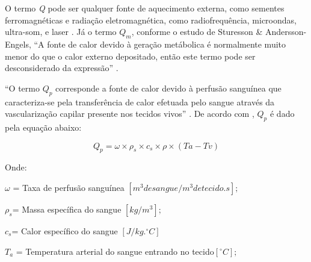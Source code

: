  O termo {\itshape Q} pode ser qualquer fonte de aquecimento externa, como sementes ferromagnéticas e radiação eletromagnética, como radiofrequência, microondas, ultra-som, e laser \cite[p.10]{Giselle}. Já o termo {\itshape $Q_{m}$}, conforme o estudo de  Sturesson \& Andersson-Engels, ``A  fonte de calor devido à geração metábolica é normalmente muito menor do que o calor externo depositado, então este termo pode ser desconsiderado da expressão'' . %

       ``O termo {\itshape $Q_{p}$} corresponde a fonte de calor devido à perfusão sanguínea que caracteriza-se pela transferência de calor efetuada pelo sangue através da vascularização capilar presente nos tecidos vivos'' \cite{Carla}.%
       De acordo com \cite{Giselle},  {\itshape $Q_{p}$} é dado pela equação abaixo:


    \begin{equation} Q_{p}= \omega\times\rho_{s}\times c_{s}\times\rho\times(Ta-Tv)\end{equation} 

       Onde:

       $\omega$ = Taxa de perfusão sanguínea $[m^3 de sangue/m^3 de tecido.s];$

      $ \rho_{s} $= Massa específica do sangue $[kg/m^3];$

        $c_{s} $= Calor específico do sangue  $[J/kg.^{\circ}C]$

        $T_{a}$ = Temperatura arterial do sangue entrando no tecido$ [^{\circ}C];$

